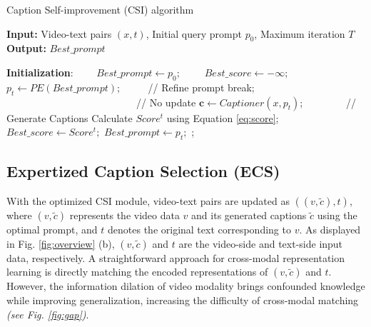 \begin{algorithm}[t]
\caption{Caption Self-improvement (CSI) algorithm}
\begin{algorithmic}[1]
\STATE \textbf{Input:} Video-text pairs \((x,t)\), Initial query prompt \(p_0\), Maximum iteration $T$
\STATE \textbf{Output:} \(Best\_prompt\) 

\STATE \textbf{Initialization}:
\STATE ~~~~\(Best\_prompt \gets p_0;\) 
\STATE ~~~~\(Best\_score \gets -\infty;\) 
    \STATE $p_t \gets PE(Best\_prompt)$; ~~~~~// Refine prompt
    \STATE break; ~~~~~~~~~~~~~~~~~~~~~~~~~~// No update
    \ENDIF
    \STATE $\mathbf{c} \gets Captioner(x,p_t)$; ~~~~~~~~// Generate Captions
    \STATE Calculate \(Score^t\) using Equation \eqref{eq:score};
    \STATE \(Best\_score \gets Score^t;\)
    \STATE \(Best\_prompt \gets p_t;\) ; 
    \ENDIF
    
    
\ENDFOR
\end{algorithmic}
\label{alg:CSI}
\end{algorithm}


\subsection{Expertized Caption Selection (ECS)}
With the optimized CSI module, video-text pairs are updated as $((v,\tilde{c}),t)$, where $(v,\tilde{c})$ represents the video data $v$ and its generated captions $\tilde{c}$ using the optimal prompt, and $t$ denotes the original text corresponding to $v$.
As displayed in Fig. \ref{fig:overview} (b), $(v,\tilde{c})$ and $t$ are the video-side and text-side input data, respectively. 
A straightforward approach for cross-modal representation learning is directly matching the encoded representations of $(v,\tilde{c})$ and $t$.
However, the information dilation of video modality brings confounded knowledge while improving generalization, increasing the difficulty of cross-modal matching \textit{(see Fig. \ref{fig:gap})}.


